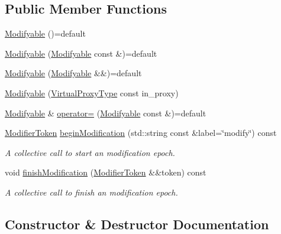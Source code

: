 \subsection*{Public Member Functions}
\begin{DoxyCompactItemize}
\item 
\hyperlink{structvt_1_1vrt_1_1collection_1_1_modifyable_ad073e54e238aa4f8c4141735f21f2a94}{Modifyable} ()=default
\item 
\hyperlink{structvt_1_1vrt_1_1collection_1_1_modifyable_a0b3ac953a30f284b7415970df401e415}{Modifyable} (\hyperlink{structvt_1_1vrt_1_1collection_1_1_modifyable}{Modifyable} const \&)=default
\item 
\hyperlink{structvt_1_1vrt_1_1collection_1_1_modifyable_af1ebf873f6dd1c7991aeaacaff77149c}{Modifyable} (\hyperlink{structvt_1_1vrt_1_1collection_1_1_modifyable}{Modifyable} \&\&)=default
\item 
\hyperlink{structvt_1_1vrt_1_1collection_1_1_modifyable_a3f1095fd21f68663a410c6a01e7f7e1b}{Modifyable} (\hyperlink{namespacevt_a1b417dd5d684f045bb58a0ede70045ac}{Virtual\+Proxy\+Type} const in\+\_\+proxy)
\item 
\hyperlink{structvt_1_1vrt_1_1collection_1_1_modifyable}{Modifyable} \& \hyperlink{structvt_1_1vrt_1_1collection_1_1_modifyable_ac3da902e782f40f8107509e63a86d072}{operator=} (\hyperlink{structvt_1_1vrt_1_1collection_1_1_modifyable}{Modifyable} const \&)=default
\item 
\hyperlink{structvt_1_1vrt_1_1collection_1_1_modifier_token}{Modifier\+Token} \hyperlink{structvt_1_1vrt_1_1collection_1_1_modifyable_a29d7b74d412571f4c5d413232a1788cd}{begin\+Modification} (std\+::string const \&label=\char`\"{}modify\char`\"{}) const
\begin{DoxyCompactList}\small\item\em A collective call to start an modification epoch. \end{DoxyCompactList}\item 
void \hyperlink{structvt_1_1vrt_1_1collection_1_1_modifyable_ab9fa4359a6924da65dab50a542d91cba}{finish\+Modification} (\hyperlink{structvt_1_1vrt_1_1collection_1_1_modifier_token}{Modifier\+Token} \&\&token) const
\begin{DoxyCompactList}\small\item\em A collective call to finish an modification epoch. \end{DoxyCompactList}\end{DoxyCompactItemize}


\subsection{Constructor \& Destructor Documentation}
\mbox{\label{structvt_1_1vrt_1_1collection_1_1_modifyable_ad073e54e238aa4f8c4141735f21f2a94}} 
